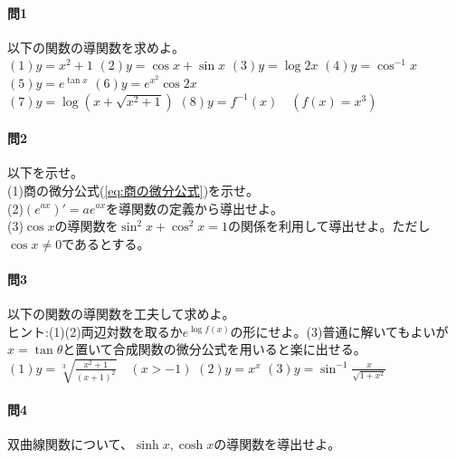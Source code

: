 \documentclass[a4j,dvipdfmx]{jsarticle}
\begin{document}
                \paragraph{問1}以下の関数の導関数を求めよ。\\
                $(1)y=x^2+1$\hspace{3mm}
                $(2)y=\cos x+\sin x$\hspace{3mm}
                $(3)y=\log 2x$\hspace{3mm}
                $(4)y=\cos^{-1}x$\hspace{3mm}
                $(5)y=e^{\tan x}$\hspace{3mm}
                $(6)y=e^{x^2}\cos 2x$\\
                $\displaystyle(7)y=\log(x+\sqrt{x^2+1})$\hspace{3mm}
                $(8)y=f^{-1}(x)\quad (f(x)=x^3)$

                \paragraph{問2}以下を示せ。\\
                (1)商の微分公式(\ref{eq:商の微分公式})を示せ。\\
                (2)$(e^{ax})'=ae^{ax}$を導関数の定義から導出せよ。\\
                (3)$\cos x$の導関数を$\sin^2 x+\cos ^2 x=1$の関係を利用して導出せよ。ただし$\cos x\neq 0$であるとする。

                \paragraph{問3}以下の関数の導関数を工夫して求めよ。\\{\scriptsize ヒント:(1)(2)両辺対数を取るか$e^{\log f(x)}$の形にせよ。(3)普通に解いてもよいが$x=\tan \theta$と置いて合成関数の微分公式を用いると楽に出せる。}\\
                $\displaystyle(1)y=\sqrt[3]{\frac{x^2+1}{(x+1)^2}}\quad(x>-1)$\hspace{3mm}
                $(2)y=x^x$\hspace{3mm}
                $\displaystyle(3)y=\sin^{-1}\frac{x}{\sqrt{1+x^2}}$

                \paragraph{問4}双曲線関数について、$\sinh x,\cosh x$の導関数を導出せよ。
\end{document}
